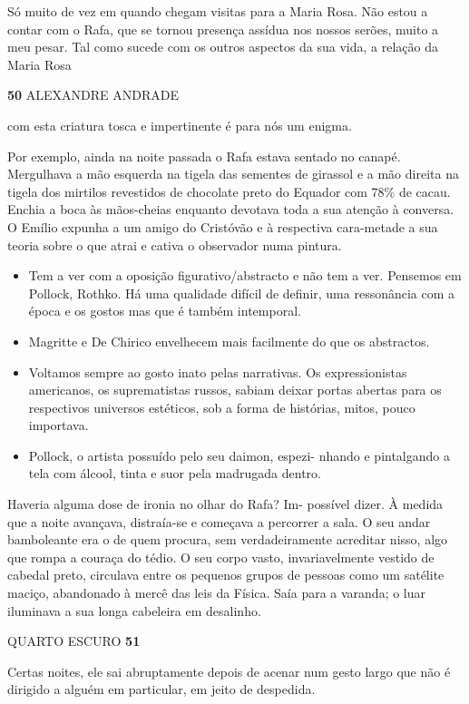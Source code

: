 Só muito de vez em quando chegam visitas para a Maria Rosa. Não estou a
contar com o Rafa, que se tornou presença assídua nos nossos serões,
muito a meu pesar. Tal como sucede com os outros aspectos da sua vida, a
relação da Maria Rosa

\textbf{50 }ALEXANDRE ANDRADE

com esta criatura tosca e impertinente é para nós um enigma.

Por exemplo, ainda na noite passada o Rafa estava sentado no canapé.
Mergulhava a mão esquerda na tigela das sementes de girassol e a mão
direita na tigela dos mirtilos revestidos de chocolate preto do Equador
com 78\% de cacau. Enchia a boca às mãos-cheias enquanto devotava toda a
sua atenção à conversa. O Emílio expunha a um amigo do Cristóvão e à
respectiva cara-metade a sua teoria sobre o que atrai e cativa o
observador numa pintura.

\begin{itemize}
\tightlist
\item
  Tem a ver com a oposição figurativo/abstracto e não tem a ver.
  Pensemos em Pollock, Rothko. Há uma qualidade difícil de definir, uma
  ressonância com a época e os gostos mas que é também intemporal.
\item
  Magritte e De Chirico envelhecem mais facilmente do que os abstractos.
\item
  Voltamos sempre ao gosto inato pelas narrativas. Os expressionistas
  americanos, os suprematistas russos, sabiam deixar portas abertas para
  os respectivos universos estéticos, sob a forma de histórias, mitos,
  pouco importava.
\item
  Pollock, o artista possuído pelo seu daimon, espezi- nhando e
  pintalgando a tela com álcool, tinta e suor pela madrugada dentro.
\end{itemize}

Haveria alguma dose de ironia no olhar do Rafa? Im- possível dizer. À
medida que a noite avançava, distraía-se e começava a percorrer a sala.
O seu andar bamboleante era o de quem procura, sem verdadeiramente
acreditar nisso, algo que rompa a couraça do tédio. O seu corpo vasto,
invariavelmente vestido de cabedal preto, circulava entre os pequenos
grupos de pessoas como um satélite maciço, abandonado à mercê das leis
da Física. Saía para a varanda; o luar iluminava a sua longa cabeleira
em desalinho.

QUARTO ESCURO \textbf{51}

Certas noites, ele sai abruptamente depois de acenar num gesto largo que
não é dirigido a alguém em particular, em jeito de despedida.

